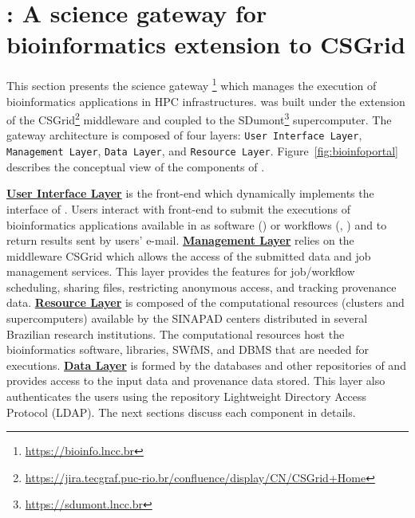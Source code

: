 \section{\system: A science gateway for bioinformatics extension to CSGrid}\label{sec:bioinfo}

This section presents the science gateway \system\footnote{\url{https://bioinfo.lncc.br}} which manages the execution of bioinformatics applications in HPC infrastructures. \system was built under the extension of the CSGrid\footnote{\url{https://jira.tecgraf.puc-rio.br/confluence/display/CN/CSGrid+Home}} middleware and coupled to the SDumont\footnote{\url{https://sdumont.lncc.br}} supercomputer. The \system gateway architecture is composed of four layers: \texttt{User Interface Layer}, \texttt{Management Layer}, \texttt{Data Layer}, and \texttt{Resource Layer}. Figure~\ref{fig:bioinfoportal} describes the conceptual view of the components of \system.

\underline{\textbf{User Interface Layer}} is the front-end which dynamically implements the interface of \system. Users interact with front-end to submit the executions of bioinformatics applications available in \system as software (\raxml) or workflows (\sci, \swift) and to return results sent by users’ e-mail. \underline{\textbf{Management Layer}} relies on the middleware CSGrid which allows the access of the submitted data and job management services. This layer provides the features for job/workflow scheduling, sharing files, restricting anonymous access, and tracking provenance data. \underline{\textbf{Resource Layer}} is composed of the computational resources (clusters and supercomputers) available by the SINAPAD centers distributed in several Brazilian research institutions. The computational resources host the bioinformatics software, libraries, SWfMS, and DBMS that are needed for executions. \underline{\textbf{Data Layer}} is formed by the databases and other repositories of \system and provides access to the input data and provenance data stored. This layer also authenticates the users using the repository Lightweight Directory Access Protocol (LDAP). The next sections discuss each component in details.

